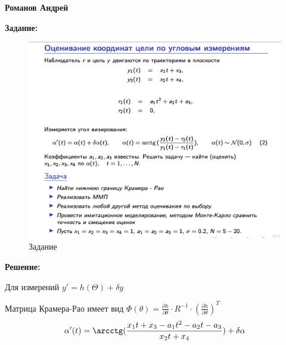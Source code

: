 \documentclass[a4paper,14pt]{article}
\theoremstyle{plain} %
\theoremstyle{definition} %
\theoremstyle{remark} %
\begin{document}
\textbf{Романов Андрей}

\textbf{Задание:}

\begin{figure}[h!]
	\centering
	\includegraphics[width=0.9\linewidth]{tasks.png}
	\caption{Задание}
	\label{fig:gyrobus}
\end{figure}

\textbf{Решение:}

Для измерений
$y'=h(\Theta)+\delta y$

Матрица Крамера-Рао имеет вид
$\Phi(\theta)=\frac{\partial h}{\partial \theta}\cdot R^{-1} \cdot \left(\frac{\partial h}{\partial \theta}\right)^T$
$$\alpha'(t)=\arcctg(\frac{x_1t+x_3-a_1t^2-a_2t-a_3}{x_2t+x_4})+\delta \alpha$$
\end{document}
